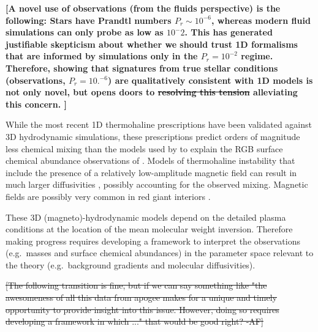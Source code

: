\textbf{[A novel use of observations (from the fluids perspective) is the following: Stars have Prandtl numbers $P_r \sim 10^{-6}$, whereas modern fluid simulations can only probe as low as $10^-2$. This has generated justifiable skepticism about whether we should trust 1D formalisms that are informed by simulations only in the $P_r = 10^{-2}$ regime. Therefore, showing that signatures from true stellar conditions (observations, $P_r = 10.^{-6}$) are qualitatively consistent with 1D models is not only novel, but opens doors to \sout{resolving this tension} alleviating this concern. ]}

While the most recent 1D thermohaline prescriptions \citep[e.g.~][]{traxler_etal_2011,brown_etal_2013} have been validated against 3D hydrodynamic simulations, these prescriptions predict orders of magnitude less chemical mixing than the models used by \citet{charbonnel_thermohaline_2007} to explain the RGB surface chemical abundance observations of \citet{Gratton2000} \citep[see Sec.~3.1 of][]{traxler_etal_2011}. 
Models of thermohaline instability that include the presence of a relatively low-amplitude magnetic field can result in much larger diffusivities \citep{harrington}, possibly accounting for the observed mixing. Magnetic fields are possibly very common in red giant interiors \citep{Fuller2015,Stello:2016}. 

These 3D (magneto)-hydrodynamic models depend on the detailed plasma conditions at the location of the mean molecular weight inversion. Therefore making progress requires developing a framework to interpret the observations (e.g.~masses and surface chemical abundances) in the parameter space relevant to the theory (e.g.~background gradients and molecular diffusivities).    

%
\sout{[The following transition is fine, but if we can say something like "the awesomeness of all this data from apogee makes for a unique and timely opportunity to provide insight into this issue. However, doing so requires developing a framework in which ..." that would be good right? -AF]}

